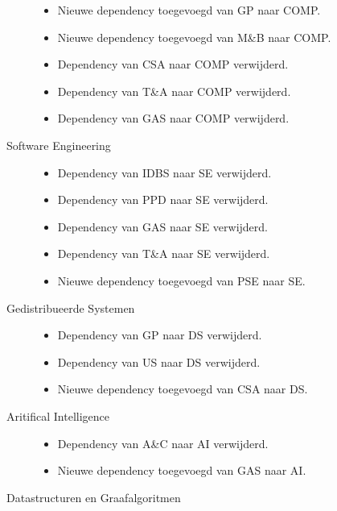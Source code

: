 \documentclass[a4paper]{article}
\begin{document}
\begin{multicols*}{2}
\begin{description}
\begin{itemize}
                    \item Nieuwe dependency toegevoegd van GP naar COMP.
                    \item Nieuwe dependency toegevoegd van M\&B naar COMP.
                    \item Dependency van CSA naar COMP verwijderd.
                    \item Dependency van T\&A naar COMP verwijderd.
                    \item Dependency van GAS naar COMP verwijderd.
            \end{itemize}
            \pagebreak[3]
            \item[Software Engineering] \hfill
            \begin{itemize}
                    \item Dependency van IDBS naar SE verwijderd.
                    \item Dependency van PPD naar SE verwijderd.
                    \item Dependency van GAS naar SE verwijderd.
                    \item Dependency van T\&A naar SE verwijderd.
                    \item Nieuwe dependency toegevoegd van PSE naar SE.
            \end{itemize}
            \pagebreak[3]
            \item[Gedistribueerde Systemen] \hfill
            \begin{itemize}
                    \item Dependency van GP naar DS verwijderd.
                    \item Dependency van US naar DS verwijderd.
                    \item Nieuwe dependency toegevoegd van CSA naar DS.
            \end{itemize}
            \pagebreak[3]
            \item[Aritifical Intelligence] \hfill
            \begin{itemize}
                    \item Dependency van A\&C naar AI verwijderd.
                    \item Nieuwe dependency toegevoegd van GAS naar AI.
            \end{itemize}
            \pagebreak[3]
            \item[Datastructuren en Graafalgoritmen] \hfill
            \begin{itemize}

\end{itemize}
\end{description}
\end{multicols*}
\end{document}
